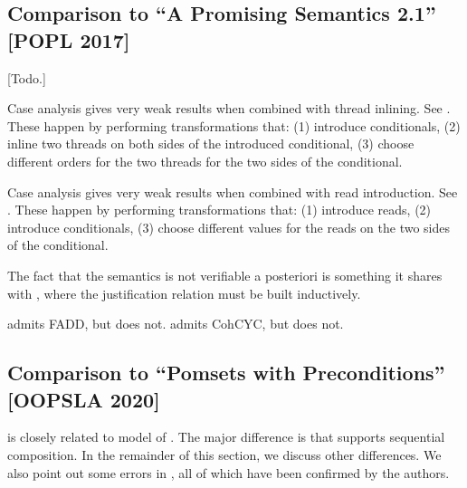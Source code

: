 \subsection{Comparison to ``A Promising Semantics 2.1'' [POPL 2017]}
\label{sec:promising}

[Todo.]

Case analysis gives very weak results when combined with thread inlining.
See \cite[\textsection B.1]{DBLP:journals/pacmpl/ChakrabortyV19appendix}.
These happen by performing transformations that: 
(1) introduce conditionals,
(2) inline two threads on both sides of the introduced conditional,
(3) choose different orders for the two threads for the two sides of the conditional.

Case analysis gives very weak results when combined with read introduction.
See \cite{promising-ldrf}.
These happen by performing transformations that: 
(1) introduce reads,
(2) introduce conditionals,
(3) choose different values for the reads on the two sides of the conditional.


The fact that the semantics is not verifiable a posteriori is something it
shares with \weakestmo{}, where the justification relation must be built
inductively.

\weakestmo{} admits FADD, but \PS{} does not.
\PS{} admits CohCYC, but \weakestmo{} does not.



\subsection{Comparison to ``Pomsets with Preconditions'' [OOPSLA 2020]}
\label{sec:diff}

\PwTmca{} is closely related to \PwP{} model of
\citep{DBLP:journals/pacmpl/JagadeesanJR20}.  The major difference is that
\PwTmca{} supports sequential composition.  In the remainder of this section,
we discuss other differences.  We also point out some errors in
\cite{DBLP:journals/pacmpl/JagadeesanJR20}, all of which have been confirmed
by the authors.


